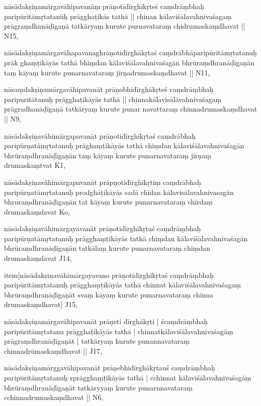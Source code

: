\begin{marma}[hp03_114]
\item[nāsādakṣiṇamārgavāhipavanāṃ prāṇotīdīrghīkṛteś
caṃdrāṃbhaḥ paripūritāmṛtatanūḥ prāgghaṭikās tathā ||
chinan kālaviśālavahnivaśagaṃ prāgraṃdhanāḍīgaṇā
tatkāryaṃ kurute purnavataraṃ chidrumaskaṃdhavat ||] N15,

\item[nāsādakṣiṇamārgavāhapavanaghrāṇotidīrghākṛtaś
caṃdrābhāparipūritāmṛtatanuḥ prāk ghaṃṭikāyās tathā 
bhiṃdan kālaviśālavahnivaśagān bhrūraṃdhranāḍīgaṇān
taṃ kāyaṃ kurute punarnavataraṃ jīrṇadrumaskaṃdhavat ||] N11,

\item[nāsaṃdakṣiṇamārgavāhipavanāt prāṇobhidīrghākṛteś
caṃdrāṃbhaḥ paripuritātanuḥ prāgghaṭikāyās tathā ||
chinnakālavisālāvahnivaśagaṃ prāgradhanāḍīgaṇā
tatkāryaṃ kurute punar navattaraṃ chinnadrumaskaṃdhavat ||] N9,

\item[nāsādakṣiṇavāhimārgapavanāt prāṇotidīrghīkṛtaś
caṃdrābhaḥ paripūrṇatāmṛtatanuḥ prāghaṃṭikāyās tathā
chiṃdan kālaviśālavahnivaśagān bhrūraṃdhranāḍīgaṇān
taṃ kāyaṃ kurute punarnavataraṃ jīrṇaṃ drumaskaṃtvat] K1,

\item[nāsādakṣiṇavāhimārgapavanāt prāpṇotidīrghīkṛtiṃ
caṃdrābhaḥ paripūrṇatāmṛtatanuḥ prodghāṭikāyās sadā
chīdan kālavisālavahnivasagān bhruraṃdhranāḍīgaṇān
tat kāyaṃ kurute punarnavataraṃ chīrdaṃ drumaskaṃdavat] Ko,

\item[nāsādakṣiṇavāhimārgayavanāt prāṇotidīrghīkṛtaś
caṃdrāṃbhaḥ paripūrṇatāmṛtatanuḥ prāgghaṃṭikāyās tathā
chiṃdan kālaviśālavahnivaśagān bhrūraṃdhranāḍīgaṇān
tatkālaṃ kurute punarnavataraṃ chiṃdan drumaskaṃdavat] J14,

item[nāsādakṣiṇavāhimārgayavano prāṇotidīrghīkṛtaś
caṃdrāṃbhaḥ paripūritāmṛtatanuḥ prāgghaṃṭikāyās tathā
chinnat kālaviśālavahnivaśagaṃ bhrūraṃdhranāḍīgaṇāt
svaṃ kāyaṃ kurute punarnavataraṃ chinna drumaskaṃdhavat] J15,

\item[nāsādakṣiṇamārgavāhipavanāt prāṇeti dīrghākṛti |
ścaṃdrāṃbhaḥ paripūritāmṛtatanu prāgghaṭikāyās tathā |
chinnatkālaviśālavahnivaśagāṃ prāgraṃdhranāḍīgaṇāt |
tatkāryaṃ kurute punannavataraṃ chinnadrūmaskaṃdhavat ||] J17,

\item[nāsādakṣiṇamārggavāhipavanāt prāṇebhidīrghākṛtauś
caṃdrāṃbhaḥ paripūritāmṛtatanuḥ rprāgghaṃṭikāyās tathā |
cchinnat kālaviśālavahnivaśagāṃ bhrūraṃdhranāḍīgaṇāt
tatkāryyaṃ kurute punarnnavataraṃ cchinnadrumaskaṃdhavat ||] N6,


\end{marma}
